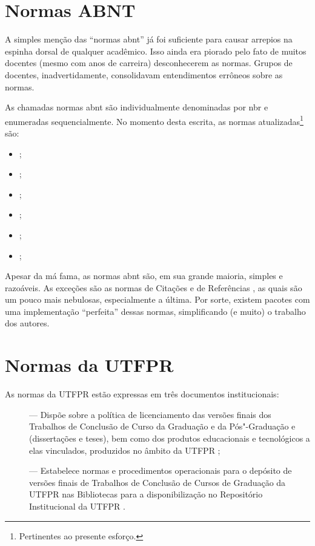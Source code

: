 \section{Normas ABNT}

A simples menção das \enquote{normas \ac{abnt}} já foi suficiente para causar arrepios na espinha dorsal de qualquer acadêmico. Isso ainda era piorado pelo fato de muitos docentes (mesmo com anos de carreira) desconhecerem as normas. Grupos de docentes, inadvertidamente, consolidavam entendimentos errôneos sobre as normas.

As chamadas normas \ac{abnt} são individualmente denominadas por \ac{nbr} e enumeradas sequencialmente. No momento desta escrita, as normas atualizadas\footnote{Pertinentes ao presente esforço.} são:
\begin{itemize}
	\item {} \cite{NBR6023};
	\item {} \cite{NBR6024};
	\item {} \cite{NBR6027};
	\item {} \cite{NBR6028};
	\item {} \cite{NBR10520};
	\item {} \cite{NBR14724};
\end{itemize}

Apesar da má fama, as normas \ac{abnt} são, em sua grande maioria, simples e razoáveis. As exceções são as normas de Citações \cite{NBR10520} e de Referências \cite{NBR6023}, as quais são um pouco mais nebulosas, especialmente a última. Por sorte, existem pacotes com uma implementação \enquote{perfeita} dessas normas, simplificando (e muito) o trabalho dos autores.

\section{Normas da UTFPR}

As normas da UTFPR estão expressas em três documentos institucionais:
\begin{description}
	\item[] --- Dispõe sobre a política de licenciamento das versões finais dos Trabalhos de Conclusão de Curso da Graduação e da Pós"-Graduação  e  (dissertações e teses), bem como dos produtos educacionais e tecnológicos a elas vinculados, produzidos no âmbito da UTFPR \cite{cogep2021};
	\item[] --- Estabelece normas e procedimentos operacionais para o depósito de versões finais de Trabalhos de Conclusão de Cursos de Graduação da UTFPR nas Bibliotecas para a disponibilização no Repositório Institucional da UTFPR \cite{prograd2021}.
\end{description}

